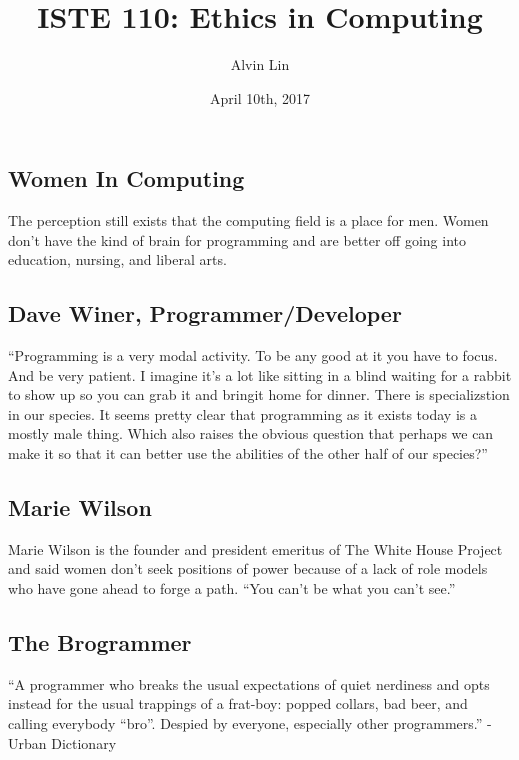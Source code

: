\documentclass{article}
\title{ISTE 110: Ethics in Computing}
\author{Alvin Lin}
\date{April 10th, 2017}
\begin{document}
\maketitle

\subsection*{Women In Computing}
The perception still exists that the computing field is a place for men. Women
don't have the kind of brain for programming and are better off going into
education, nursing, and liberal arts.

\subsection*{Dave Winer, Programmer/Developer}
``Programming is a very modal activity. To be any good at it you have to focus.
And be very patient. I imagine it's a lot like sitting in a blind waiting for a
rabbit to show up so you can grab it and bringit home for dinner. There is
specializstion in our species. It seems pretty clear that programming as it
exists today is a mostly male thing. Which also raises the obvious question
that perhaps we can make it so that it can better use the abilities of the
other half of our species?''

\subsection*{Marie Wilson}
Marie Wilson is the founder and president emeritus of The White House Project
and said women don't seek positions of power because of a lack of role models
who have gone ahead to forge a path. ``You can't be what you can't see.''

\subsection*{The Brogrammer}
``A programmer who breaks the usual expectations of quiet nerdiness and opts
instead for the usual trappings of a frat-boy: popped collars, bad beer, and
calling everybody ``bro''. Despied by everyone, especially other programmers.''
- Urban Dictionary
\end{document}
